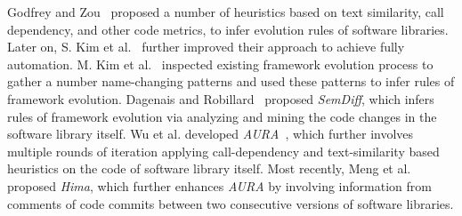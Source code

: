 Godfrey and Zou~\cite{Godfrey:TSE05} proposed a number of heuristics based on text similarity, call dependency, and other code metrics, to infer evolution rules of software libraries. Later on, S. Kim et al.~\cite{Kim:WCRE05} further improved their approach to achieve fully automation. M. Kim et al.~\cite{Kim:ICSE07} inspected existing framework evolution process to gather a number name-changing patterns and used these patterns to infer rules of framework evolution. Dagenais and Robillard~\cite{Dagenais:ICSE08} proposed \emph{SemDiff}, which infers rules of framework evolution via analyzing and mining the code changes in the software library itself. Wu et al. developed \emph{AURA}~\cite{Wu:ICSE10}, which further involves multiple rounds of iteration applying call-dependency and text-similarity based heuristics on the code of software library itself. Most recently, Meng et al.~\cite{Meng1} proposed \emph{Hima}, which further enhances \emph{AURA} by involving information from comments of code commits between two consecutive versions of software libraries. 




